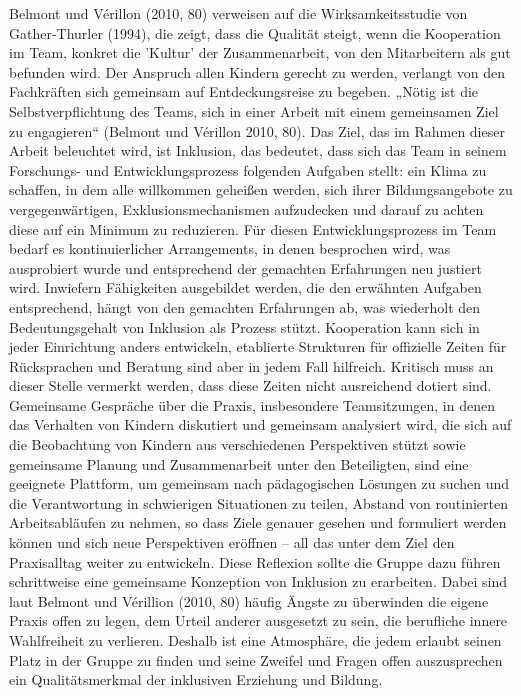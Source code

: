 Belmont und Vérillon (2010, 80) verweisen auf die Wirksamkeitsstudie von Gather-Thurler (1994), die zeigt, dass die Qualität steigt, wenn die Kooperation im Team, konkret die 'Kultur' der Zusammenarbeit, von den Mitarbeitern als gut befunden wird.  
Der Anspruch allen Kindern gerecht zu werden, verlangt von den Fachkräften sich gemeinsam auf Entdeckungsreise zu begeben. „Nötig ist die Selbstverpflichtung des Teams, sich in einer Arbeit mit einem gemeinsamen Ziel zu engagieren“ (Belmont und Vérillon 2010, 80). Das Ziel, das im Rahmen dieser Arbeit beleuchtet wird, ist Inklusion, das bedeutet, dass sich das Team in seinem Forschungs- und Entwicklungsprozess folgenden Aufgaben stellt: 
ein Klima zu schaffen, in dem alle willkommen geheißen werden, sich ihrer Bildungsangebote zu vergegenwärtigen, Exklusionsmechanismen aufzudecken und darauf zu achten diese auf ein Minimum zu reduzieren.
Für diesen Entwicklungsprozess im Team bedarf es kontinuierlicher Arrangements, in denen besprochen wird, was ausprobiert wurde und entsprechend der gemachten Erfahrungen neu justiert wird. Inwiefern Fähigkeiten ausgebildet werden, die den erwähnten Aufgaben entsprechend, hängt von den gemachten Erfahrungen ab, was wiederholt den Bedeutungsgehalt von Inklusion als Prozess stützt. 
Kooperation kann sich in jeder Einrichtung anders entwickeln, etablierte Strukturen für offizielle Zeiten für Rücksprachen und Beratung sind aber in jedem Fall hilfreich. Kritisch muss an dieser Stelle vermerkt werden, dass diese Zeiten nicht ausreichend dotiert sind.
Gemeinsame Gespräche über die Praxis, insbesondere Teamsitzungen, in denen das Verhalten von Kindern diskutiert und gemeinsam analysiert wird, die sich auf die Beobachtung von Kindern aus verschiedenen Perspektiven stützt sowie gemeinsame Planung und Zusammenarbeit unter den Beteiligten, sind eine geeignete Plattform, um gemeinsam nach pädagogischen Lösungen zu suchen und die Verantwortung in schwierigen Situationen zu teilen, Abstand von routinierten Arbeitsabläufen zu nehmen, so dass Ziele genauer gesehen und formuliert werden können und sich neue Perspektiven eröffnen – all das unter dem Ziel den Praxisalltag weiter zu entwickeln.
Diese Reflexion sollte die Gruppe dazu führen schrittweise eine gemeinsame Konzeption von Inklusion zu erarbeiten.
Dabei sind laut Belmont und Vérillion (2010, 80) häufig Ängste zu überwinden die eigene Praxis offen zu legen, dem Urteil anderer ausgesetzt zu sein, die berufliche innere Wahlfreiheit zu verlieren. Deshalb ist eine Atmosphäre, die jedem erlaubt seinen Platz in der Gruppe zu finden und seine Zweifel und Fragen offen auszusprechen ein Qualitätsmerkmal der inklusiven Erziehung und Bildung.

